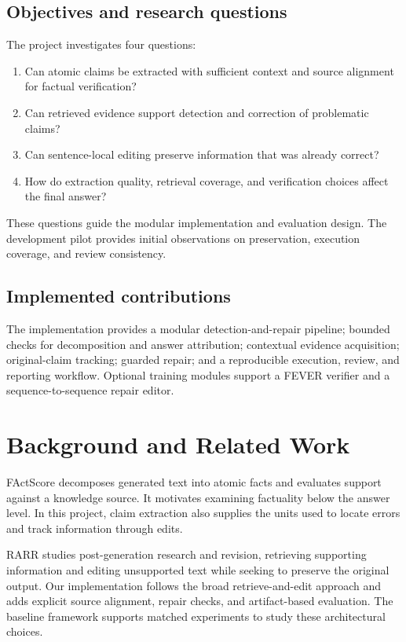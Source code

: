 \documentclass[11pt,a4paper]{article}
\begin{document}
\subsection{Objectives and research questions}
The project investigates four questions:
\begin{enumerate}
\item Can atomic claims be extracted with sufficient context and source alignment for factual verification?
\item Can retrieved evidence support detection and correction of problematic claims?
\item Can sentence-local editing preserve information that was already correct?
\item How do extraction quality, retrieval coverage, and verification choices affect the final answer?
\end{enumerate}
These questions guide the modular implementation and evaluation design. The development pilot provides initial observations on preservation, execution coverage, and review consistency.

\subsection{Implemented contributions}
The implementation provides a modular detection-and-repair pipeline; bounded checks for decomposition and answer attribution; contextual evidence acquisition; original-claim tracking; guarded repair; and a reproducible execution, review, and reporting workflow. Optional training modules support a FEVER verifier and a sequence-to-sequence repair editor.

\section{Background and Related Work}
FActScore decomposes generated text into atomic facts and evaluates support against a knowledge source. It motivates examining factuality below the answer level. In this project, claim extraction also supplies the units used to locate errors and track information through edits.

RARR studies post-generation research and revision, retrieving supporting information and editing unsupported text while seeking to preserve the original output. Our implementation follows the broad retrieve-and-edit approach and adds explicit source alignment, repair checks, and artifact-based evaluation. The baseline framework supports matched experiments to study these architectural choices.
\end{document}
